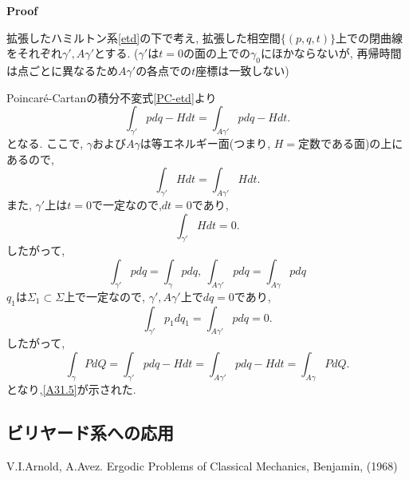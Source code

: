 \documentclass[a4paper]{ujarticle}
\makeatletter
\numberwithin{equation}{section}
\theoremstyle{definition}
\renewenvironment{proof}[1][Proof]{\par
  \pushQED{\qed}%
  \normalfont \topsep6\p@\@plus6\p@\relax
  \trivlist
  \item\relax
  {\bfseries
  #1\@addpunct{.}}\hspace\labelsep\ignorespaces
}{%
  \popQED\endtrivlist\@endpefalse
}
\makeatother
\begin{document}
    \begin{proof}
        拡張したハミルトン系\eqref{etd}の下で考え, 
        拡張した相空間$\{(p, q, t)\}$上での閉曲線をそれぞれ$\gamma', A\gamma'$とする.
        ($\gamma'$は$t = 0$の面の上での$\gamma_0$にほかならないが, 
        再帰時間は点ごとに異なるため$A \gamma'$の各点での$t$座標は一致しない)

        Poincar\'{e}-Cartanの積分不変式\ref{PC-etd}より
        \begin{equation}
            \int_{\gamma'} p dq - H dt = \int_{A \gamma'} p dq - H dt.
        \end{equation}
        となる.
        ここで, $\gamma$および$A\gamma$は等エネルギー面(つまり, $H = $定数である面)の上にあるので,
        \begin{equation}
            \int_{\gamma'} H dt = \int_{A \gamma'} H dt.
        \end{equation}
        また, $\gamma'$上は$t = 0$で一定なので,$dt = 0$であり,
        \begin{equation}
            \int_{\gamma'} H dt = 0.
        \end{equation}
        したがって, 
        \[
            \int_{\gamma'} p dq = \int_{\gamma} p dq, \ \int_{A \gamma'} p dq = \int_{A \gamma} p dq
        \]
        $q_1$は$\Sigma_1 \subset \Sigma$上で一定なので, $\gamma', A \gamma'$上で$dq = 0$であり, 
        \[
            \int_{\gamma'} p_1 dq_1 = \int_{A \gamma'} p dq = 0.
        \]
        したがって,
        \[
            \int_{\gamma} P dQ = \int_{\gamma'} p dq - H dt = \int_{A \gamma'} p dq - H dt = \int_{A \gamma} P dQ.
        \]
        となり,\eqref{A31.5}が示された.

    \end{proof}

    \subsection{ビリヤード系への応用}
    

    \begin{thebibliography}{10}
    \nocite{*}
	 V.I.Arnold, A.Avez. Ergodic Problems of Classical Mechanics, Benjamin, (1968)
\end{thebibliography}
\end{document}
